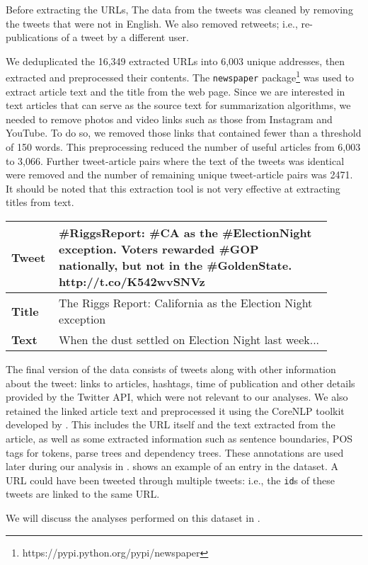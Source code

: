 Before extracting the URLs, The data from the tweets was cleaned by removing the tweets that were not in English. We also removed retweets; i.e., re-publications of a tweet by a different user.

We deduplicated the 16,349 extracted URLs into 6,003 unique addresses, then extracted and preprocessed their contents. The \texttt{newspaper} package\footnote{https://pypi.python.org/pypi/newspaper} was used to extract article text and the title from the web page. Since we are interested in text articles that can serve as the source text for summarization algorithms, we needed to remove photos and video links such as those from Instagram and YouTube. To do so, we removed those links that contained fewer than a threshold of 150 words. This preprocessing reduced the number of useful articles from 6,003 to 3,066. Further tweet-article pairs where the text of the tweets was identical were removed and the number of remaining unique tweet-article pairs was 2471. It should be noted that this extraction tool is not very effective at extracting titles from text.

\begin{table}[!t]
\centering
\begin{tabular}{|p{0.1\linewidth}|p{0.8\linewidth}|}
\hline
\textbf{Tweet} & \#RiggsReport: \#CA as the \#ElectionNight exception. Voters rewarded \#GOP nationally, but not in the \#GoldenState. http://t.co/K542wvSNVz \\ \hline
\textbf{Title} & The Riggs Report: California as the Election Night exception                                                                                 \\ \hline
\textbf{Text}  & When the dust settled on Election Night last week...                                                                                         \\ \hline
\end{tabular}
\label{tab:ex1}
\end{table}

The final version of the data consists of tweets along with other information about the tweet: links to articles, hashtags, time of publication and other details provided by the Twitter API, which were not relevant to our analyses. We also retained the linked article text and preprocessed it using the CoreNLP toolkit developed by  \cite{manning2014stanford}. This includes the URL itself and the text extracted from the article, as well as some extracted information such as sentence boundaries, POS tags for tokens, parse trees and dependency trees. These annotations are used later during our analysis in .  shows an example of an entry in the dataset. A URL could have been tweeted through multiple tweets: i.e.,  the \texttt{id}s of these tweets are linked to the same URL.

We will discuss the analyses performed on this dataset in .